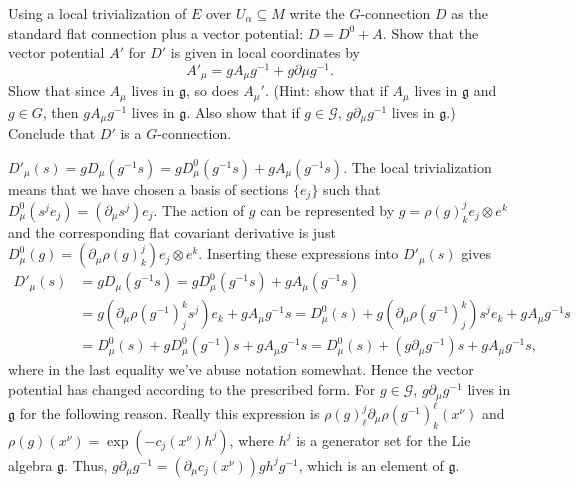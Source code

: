 \setcounter{p}{85}
\begin{p}%
{Using a local trivialization of $E$ over $U_\alpha\subseteq M$ write the $G$-connection $D$ as the standard flat connection plus a vector potential: $D=D^0+A$. Show that the vector potential $A'$ for $D'$ is given in local coordinates by $$A'_\mu=gA_\mu g^{-1}+g\partial\mu g^{-1}.$$ Show that
since $A_\mu$ lives in $\mathfrak{g}$, so does $A_\mu'$. (Hint: show that if $A_\mu$ lives in $\mathfrak{g}$ and $g\in G$, then $g A_\mu g^{-1}$ lives in $\mathfrak{g}$. Also show that if 
$g\in\mathcal{G}$, $g\partial_\mu g^{-1}$ lives in $\mathfrak{g}$.) Conclude that $D'$ is a $G$-connection.}
\end{p}
{$D'_\mu(s)=gD_\mu(g^{-1}s)=gD_\mu^0(g^{-1}s)+gA_\mu(g^{-1}s)$. The local trivialization 
means that we have chosen a basis of sections $\{e_j\}$ such that $D_\mu^0(s^je_j)=(\partial_\mu s^j)e_j$. The action of $g$ can be represented by $g=\rho(g)^j_k e_j\otimes e^k$ and the corresponding
flat covariant derivative is just $D_\mu^0(g)=(\partial_\mu \rho(g)^j_k)e_j\otimes e^k$. Inserting these expressions into $D'_\mu(s)$ gives 
\begin{align}
D'_\mu(s)&=g D_\mu(g^{-1}s)=gD_\mu^0(g^{-1}s)+gA_\mu(g^{-1}s)\\
&=g\left(\partial_\mu \rho(g^{-1})^k_j s^j\right) e_k+gA_\mu g^{-1}s
=D_\mu^0(s)+g\left(\partial_\mu \rho(g^{-1})^k_j \right)s^j e_k+gA_\mu g^{-1}s\\
&=D_\mu^0(s)+gD_\mu^0(g^{-1})s+gA_\mu g^{-1}s=D_\mu^0(s)+(g\partial_\mu g^{-1})s+gA_\mu g^{-1}s,
\end{align}
where in the last equality we've abuse notation somewhat. Hence the vector potential has changed
according to the prescribed form. For $g\in\mathcal{G}$, $g\partial_\mu g^{-1}$ lives in $\mathfrak{g}$ for the following reason. Really this expression is $\rho(g)^j_\ell \partial_\mu \rho(g^{-1})^{\ell}_k(x^\nu)$ and $\rho(g)(x^\nu)=\exp\left(-c_j(x^\nu)h^j\right)$, where
$h^j$ is a generator set for the Lie algebra $\mathfrak{g}$. Thus, $g\partial_\mu g^{-1}=(\partial_\mu c_j(x^\nu))g h^jg^{-1}$, which is
an element of $\mathfrak{g}$. 
 }

 \begin{p}%
 \end{p}

 \newpage



